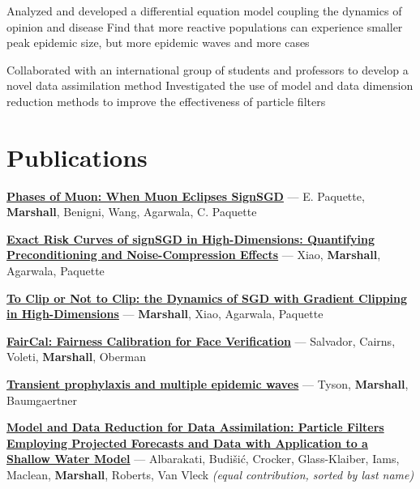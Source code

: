 \documentclass{muratcan_cv}
\begin{document}
      \begin{itemize}
         \footnotesize{
           Analyzed and developed a differential equation model coupling the dynamics of opinion and disease
          Find that more reactive populations can experience smaller peak epidemic size, but more epidemic waves and more cases
         }
     \end{itemize}
    
      \begin{itemize}
         \footnotesize{         
          Collaborated with an international group of students and professors to develop a novel data assimilation method
          Investigated the use of model and data dimension reduction methods to improve the effectiveness of particle filters
         }
     \end{itemize}
    
\section{Publications}

\begin{itemize}
         \footnotesize{
          {} \href{https://arxiv.org/abs/2605.09552}{\textbf{Phases of Muon: When Muon Eclipses SignSGD}} --- E. Paquette, \textbf{Marshall}, Benigni, Wang, Agarwala, C. Paquette

          {} \href{https://openreview.net/forum?id=MQpAF3Z1YD}{\textbf{Exact Risk Curves of signSGD in High-Dimensions: Quantifying Preconditioning and Noise-Compression Effects}} --- Xiao, \textbf{Marshall}, Agarwala, Paquette

          {} \href{https://openreview.net/forum?id=jmN1zXMq0O}{\textbf{To Clip or Not to Clip: the Dynamics of SGD with Gradient Clipping in High-Dimensions}} --- \textbf{Marshall}, Xiao, Agarwala, Paquette

          {} \href{https://openreview.net/forum?id=nRj0NcmSuxb}{\textbf{FairCal: Fairness Calibration for Face Verification}} --- Salvador, Cairns, Voleti, \textbf{Marshall}, Oberman

          {} \href{http://dx.doi.org/10.3934/math.2022311}{\textbf{Transient prophylaxis and multiple epidemic waves}} --- Tyson, \textbf{Marshall}, Baumgaertner

          {} \href{http://dx.doi.org/10.1016/j.camwa.2021.05.026}{\textbf{Model and Data Reduction for Data Assimilation: Particle Filters Employing Projected Forecasts and Data with Application to a Shallow Water Model}} --- Albarakati, Budi\v{s}i\'c, Crocker, Glass-Klaiber, Iams, Maclean, \textbf{Marshall}, Roberts, Van Vleck {\scriptsize \textit{(equal contribution, sorted by last name)}}
         }
\end{itemize}
\end{document}
